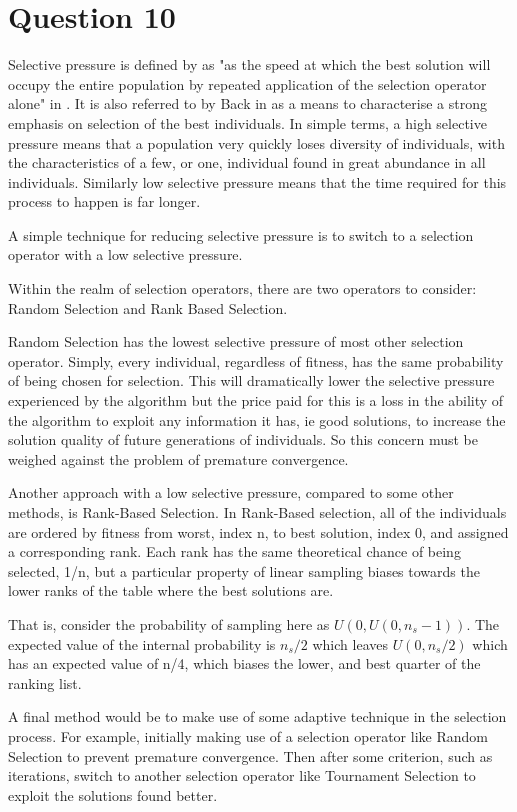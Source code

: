 \documentclass[12pt]{article}
\begin{document}
\section{Question 10}
Selective pressure is defined by as "as the speed at which the best solution will occupy the entire population by repeated application of the selection operator alone" in \cite{engelCI02}. It is also referred to by Back in \cite{Back94selectivepressure} as a means to characterise a strong emphasis on selection of the best individuals. In simple terms, a high selective pressure means that a population very quickly loses diversity of individuals, with the characteristics of a few, or one, individual found in great abundance in all individuals. Similarly low selective pressure means that the time required for this process to happen is far longer.

A simple technique for reducing selective pressure is to switch to a selection operator with a low selective pressure.  

Within the realm of selection operators, there are two operators to consider: Random Selection and Rank Based Selection.

Random Selection has the lowest selective pressure of most other selection operator. Simply, every individual, regardless of fitness, has the same probability of being chosen for selection. This will dramatically lower the selective pressure experienced by the algorithm but the price paid for this is a loss in the ability of the algorithm to exploit any information it has, ie good solutions, to increase the solution quality of future generations of individuals. So this concern must be weighed against the problem of premature convergence.

Another approach with a low selective pressure, compared to some other methods, is Rank-Based Selection.
In Rank-Based selection, all of the individuals are ordered by fitness from worst, index n, to best solution, index 0, and assigned a corresponding rank. Each rank has the same theoretical chance of being selected, 1/n, but a particular property of linear sampling biases towards the lower ranks of the table where the best solutions are.

That is, consider the probability of sampling here as $U(0,U(0,n_s−1))$. The expected value of the internal probability is $n_s/2$ which leaves $U(0,n_s/2)$ which has an expected value of n/4, which biases the lower, and best quarter of the ranking list.

A final method would be to make use of some adaptive technique in the selection process. For example, initially making use of a selection operator like Random Selection to prevent premature convergence. Then after some criterion, such as iterations, switch to another selection operator like Tournament Selection to exploit the solutions found better.
\end{document}
